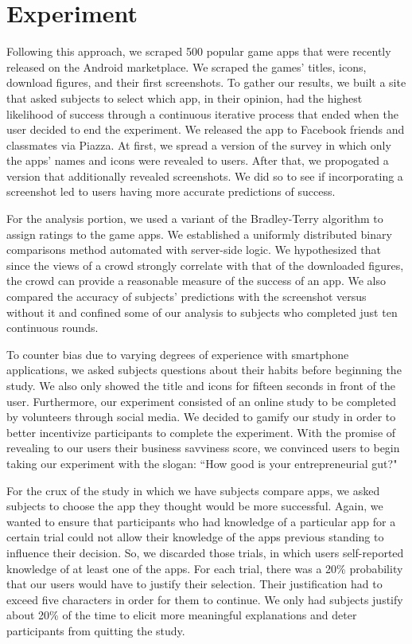 \section{Experiment}


Following this approach, we scraped 500 popular game apps that were recently released on the Android marketplace. We scraped the games' titles, icons, download figures, and their first screenshots. To gather our results, we built a site that asked subjects to select which app, in their opinion, had the highest likelihood of success through a continuous iterative process that ended when the user decided to end the experiment. We released the app to Facebook friends and classmates via Piazza. At first, we spread a version of the survey in which only the apps' names and icons were revealed to users. After that, we propogated a version that additionally revealed screenshots. We did so to see if incorporating a screenshot led to users having more accurate predictions of success.

For the analysis portion, we used a variant of the Bradley-Terry algorithm to assign ratings to the game apps. We established a uniformly distributed binary comparisons method automated with server-side logic. We hypothesized that since the views of a crowd strongly correlate with that of the downloaded figures, the crowd can provide a reasonable measure of the success of an app. We also compared the accuracy of subjects' predictions with the screenshot versus without it and confined some of our analysis to subjects who completed just ten continuous rounds.

To counter bias due to varying degrees of experience with smartphone applications, we asked subjects questions about their habits before beginning the study. We also only showed the title and icons for fifteen seconds in front of the user. Furthermore, our experiment consisted of an online study to be completed by volunteers through social media. We decided to gamify our study in order to better incentivize participants to complete the experiment. With the promise of revealing to our users their business savviness score, we convinced users to begin taking our experiment with the slogan: “How good is your entrepreneurial gut?"

For the crux of the study in which we have subjects compare apps, we asked subjects to choose the app they thought would be more successful.  Again, we wanted to ensure that participants who had knowledge of a particular app for a certain trial could not allow their knowledge of the apps previous standing to influence their decision. So, we discarded those trials, in which users self-reported knowledge of at least one of the apps. For each trial, there was a 20\% probability that our users would have to justify their selection. Their justification had to exceed five characters in order for them to continue. We only had subjects justify about 20\% of the time to elicit more meaningful explanations and deter participants from quitting the study.